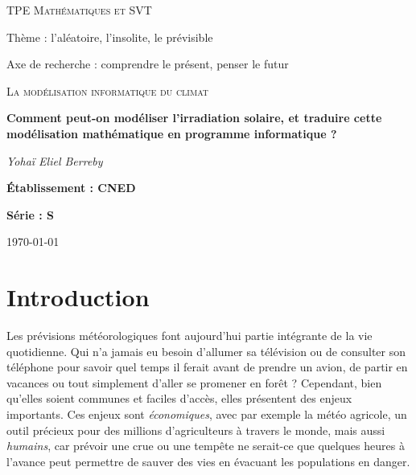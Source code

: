\documentclass[12pt]{article}
\begin{document}

\begin{titlepage}
	\centering
	
	{\scshape\large TPE Mathématiques et SVT\par}
	\vspace{0.2cm}	
	{ \Large Thème : l'aléatoire, l'insolite, le prévisible\par }
	{ \large Axe de recherche : comprendre le présent, penser le futur\par }
	\vspace{1.5cm}

	{\scshape\LARGE La modélisation informatique du climat \par}
	\vspace{1cm}
	{\huge\bfseries Comment peut-on modéliser l'irradiation solaire, et traduire cette modélisation mathématique en programme informatique ?\par}

	\vspace{1cm}
	{\Large\itshape Yohaï Eliel Berreby\par}
	
	\vfill
	
	
	{\Large\bfseries Établissement : CNED\par}
	\vspace{0.2cm}
	{\Large \bfseries Série : S }

	\vfill

	{\large \today\par}
\end{titlepage}


\clearpage
\tableofcontents{}
\clearpage


\section{Introduction} 

Les prévisions météorologiques font aujourd'hui partie intégrante de la vie quotidienne.
Qui n'a jamais eu besoin d'allumer sa télévision ou de consulter son téléphone pour savoir quel temps il ferait avant de prendre un avion, de partir en vacances ou tout simplement d'aller se promener en forêt ?
Cependant, bien qu'elles soient communes et faciles d'accès, elles présentent des enjeux importants.
Ces enjeux sont \emph{économiques}, avec par exemple la météo agricole, un outil précieux pour des millions d'agriculteurs à travers le monde, mais aussi \emph{humains}, car prévoir une crue ou une tempête ne serait-ce que quelques heures à l'avance peut permettre de sauver des vies en évacuant les populations en danger.
\end{document}
